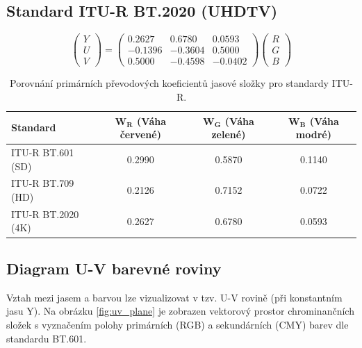 \subsection{Standard ITU-R BT.2020 (UHDTV)}

\begin{equation}
\begin{pmatrix}
Y \\
U \\
V
\end{pmatrix}
=
\begin{pmatrix}
 0.2627 &  0.6780 &  0.0593 \\
-0.1396 & -0.3604 &  0.5000 \\
 0.5000 & -0.4598 & -0.0402
\end{pmatrix}
\begin{pmatrix}
R \\
G \\
B
\end{pmatrix}
\label{eq:bt2020}
\end{equation}

\begin{table}[htbp]
\centering
\caption{Porovnání primárních převodových koeficientů jasové složky pro standardy ITU-R.}
\begin{tabular}{lccc}
\toprule
\textbf{Standard} & $\mathbf{W_R}$ (Váha červené) & $\mathbf{W_G}$ (Váha zelené) & $\mathbf{W_B}$ (Váha modré) \\
\midrule
ITU-R BT.601 (SD)  & 0.2990  & 0.5870  & 0.1140 \\
ITU-R BT.709 (HD)  & 0.2126  & 0.7152  & 0.0722 \\
ITU-R BT.2020 (4K) & 0.2627  & 0.6780  & 0.0593 \\
\bottomrule
\end{tabular}
\label{tab:yuv_coeffs}
\end{table}

\subsection{Diagram U-V barevné roviny}

Vztah mezi jasem a barvou lze vizualizovat v tzv. U-V rovině (při konstantním jasu Y). Na obrázku \ref{fig:uv_plane} je zobrazen vektorový prostor chrominančních složek s vyznačením polohy primárních (RGB) a sekundárních (CMY) barev dle standardu BT.601.

